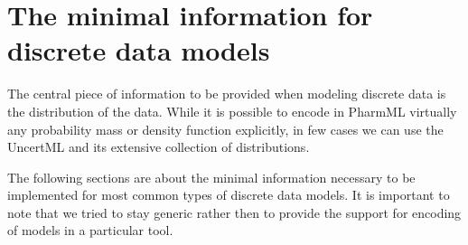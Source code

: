 
\section{The minimal information for discrete data models}
\label{subsec:mi_discreteModels}

The central piece of information to be provided when modeling discrete data is the distribution 
of the data. While it is possible to encode in PharmML virtually any 
probability mass or density function explicitly, in few cases we can use the UncertML 
\cite{uncertml3:2014} and its extensive collection of distributions. 

The following sections are about the minimal information necessary to be 
implemented for most common types of discrete data models. It is important to note 
that we tried to stay generic rather then to provide the support for 
encoding of models in a particular tool. 

